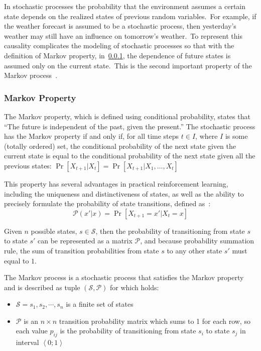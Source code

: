 \documentclass[../xlapes02]{subfiles}
\begin{document}
    In stochastic processes the probability that the environment assumes a certain state depends on the realized states of previous random variables.\ For example, if the weather forecast is assumed to be a stochastic process, then yesterday’s weather may still have an influence on tomorrow’s weather.\ To represent this causality complicates the modeling of stochastic processes so that with the definition of Markov property, in~\cref{subsubsec:markov-property}, the dependence of future states is assumed only on the current state.\ This is the second important property of the Markov process~\cite{FITMT25127}.

    \subsubsection{Markov Property}\label{subsubsec:markov-property}
    The Markov property, which is defined using conditional probability, states that ``The future is independent of the past, given the present.''
    The stochastic process has the Markov property if and only if, for all time steps $t \in I$, where $I$ is some (totally ordered) set, the conditional probability of the next state given the current state is equal to the conditional probability of the next state given all the previous states: $\Pr\left[X_{t+1}|X_t\right] = \Pr\left[X_{t+1}|X_1,\ldots,X_t\right]$

    This property has several advantages in practical reinforcement learning, including the uniqueness and distinctiveness of states, as well as the ability to precisely formulate the probability of state transitions, defined as~\cite{sutton2018reinforcement, FITMT25127}:
    \begin{equation}
        \label{eq:markov-property}
        \mathcal{P}(x'|x)=\Pr\left[X_{t+1}=x'|X_t=x\right]
    \end{equation}

    Given $n$ possible states, $s\in \mathcal{S}$, then the probability of transitioning from state $s$ to state $s'$ can be represented as a matrix $\mathcal{P}$, and because probability summation rule, the sum of transition probabilities from state $s$ to any other state $s'$ must equal to $1$.

    \begin{definition}
        The Markov process is a stochastic process that satisfies the Markov property and is described as tuple $\left(\mathcal{S}, \mathcal{P}\right)$ for which holds:\cite{ABATE2021102207}
        \begin{itemize}
            \item $\mathcal{S}=s_1,s_2,\cdots,s_n$ is a finite set of states
            \item $\mathcal{P}$ is an $n\times n$ transition probability matrix which sums to 1 for each row, so each value $p_{ij}$ is the probability of transitioning from state $s_i$ to state $s_j$ in interval $\left< 0;1 \right>$
        \end{itemize}
    \end{definition}
\end{document}
